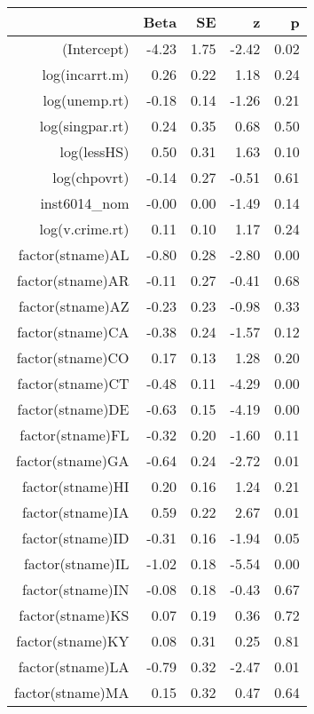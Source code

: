 \begin{table}[ht]
\centering
\begin{tabular}{rrrrr}
  \hline
 & Beta & SE & z & p \\ 
  \hline
(Intercept) & -4.23 & 1.75 & -2.42 & 0.02 \\ 
  log(incarrt.m) & 0.26 & 0.22 & 1.18 & 0.24 \\ 
  log(unemp.rt) & -0.18 & 0.14 & -1.26 & 0.21 \\ 
  log(singpar.rt) & 0.24 & 0.35 & 0.68 & 0.50 \\ 
  log(lessHS) & 0.50 & 0.31 & 1.63 & 0.10 \\ 
  log(chpovrt) & -0.14 & 0.27 & -0.51 & 0.61 \\ 
  inst6014\_nom & -0.00 & 0.00 & -1.49 & 0.14 \\ 
  log(v.crime.rt) & 0.11 & 0.10 & 1.17 & 0.24 \\ 
  factor(stname)AL & -0.80 & 0.28 & -2.80 & 0.00 \\ 
  factor(stname)AR & -0.11 & 0.27 & -0.41 & 0.68 \\ 
  factor(stname)AZ & -0.23 & 0.23 & -0.98 & 0.33 \\ 
  factor(stname)CA & -0.38 & 0.24 & -1.57 & 0.12 \\ 
  factor(stname)CO & 0.17 & 0.13 & 1.28 & 0.20 \\ 
  factor(stname)CT & -0.48 & 0.11 & -4.29 & 0.00 \\ 
  factor(stname)DE & -0.63 & 0.15 & -4.19 & 0.00 \\ 
  factor(stname)FL & -0.32 & 0.20 & -1.60 & 0.11 \\ 
  factor(stname)GA & -0.64 & 0.24 & -2.72 & 0.01 \\ 
  factor(stname)HI & 0.20 & 0.16 & 1.24 & 0.21 \\ 
  factor(stname)IA & 0.59 & 0.22 & 2.67 & 0.01 \\ 
  factor(stname)ID & -0.31 & 0.16 & -1.94 & 0.05 \\ 
  factor(stname)IL & -1.02 & 0.18 & -5.54 & 0.00 \\ 
  factor(stname)IN & -0.08 & 0.18 & -0.43 & 0.67 \\ 
  factor(stname)KS & 0.07 & 0.19 & 0.36 & 0.72 \\ 
  factor(stname)KY & 0.08 & 0.31 & 0.25 & 0.81 \\ 
  factor(stname)LA & -0.79 & 0.32 & -2.47 & 0.01 \\ 
  factor(stname)MA & 0.15 & 0.32 & 0.47 & 0.64 \\ 

\end{tabular}
\end{table}
